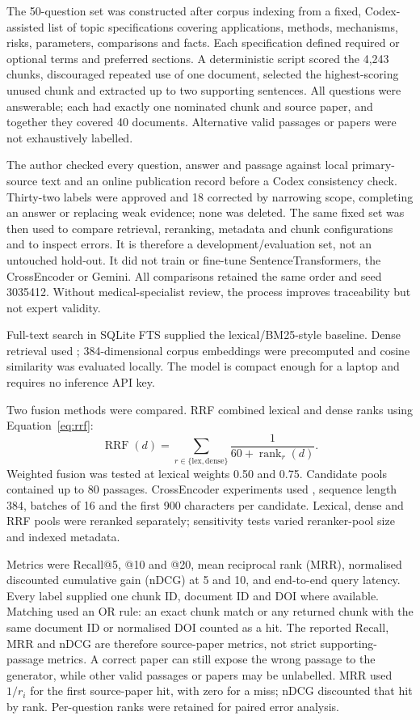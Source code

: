 \documentclass[11pt,a4paper]{article}
\begin{document}
The 50-question set was constructed after corpus indexing from a fixed, Codex-assisted list of topic specifications covering applications, methods, mechanisms, risks, parameters, comparisons and facts. Each specification defined required or optional terms and preferred sections. A deterministic script scored the 4,243 chunks, discouraged repeated use of one document, selected the highest-scoring unused chunk and extracted up to two supporting sentences. All questions were answerable; each had exactly one nominated chunk and source paper, and together they covered 40 documents. Alternative valid passages or papers were not exhaustively labelled.

The author checked every question, answer and passage against local primary-source text and an online publication record before a Codex consistency check. Thirty-two labels were approved and 18 corrected by narrowing scope, completing an answer or replacing weak evidence; none was deleted. The same fixed set was then used to compare retrieval, reranking, metadata and chunk configurations and to inspect errors. It is therefore a development/evaluation set, not an untouched hold-out. It did not train or fine-tune SentenceTransformers, the CrossEncoder or Gemini. All comparisons retained the same order and seed 3035412. Without medical-specialist review, the process improves traceability but not expert validity.

Full-text search in SQLite FTS supplied the lexical/BM25-style baseline. Dense retrieval used ; 384-dimensional corpus embeddings were precomputed and cosine similarity was evaluated locally. The model is compact enough for a laptop and requires no inference API key.

Two fusion methods were compared. RRF combined lexical and dense ranks using Equation~\eqref{eq:rrf}:
\begin{equation}
\label{eq:rrf}
\operatorname{RRF}(d)=\sum_{r\in\{\mathrm{lex},\mathrm{dense}\}}
\frac{1}{60+\operatorname{rank}_{r}(d)} .
\end{equation}
Weighted fusion was tested at lexical weights 0.50 and 0.75. Candidate pools contained up to 80 passages. CrossEncoder experiments used , sequence length 384, batches of 16 and the first 900 characters per candidate. Lexical, dense and RRF pools were reranked separately; sensitivity tests varied reranker-pool size and indexed metadata.

Metrics were Recall@5, @10 and @20, mean reciprocal rank (MRR), normalised discounted cumulative gain (nDCG) at 5 and 10, and end-to-end query latency. Every label supplied one chunk ID, document ID and DOI where available. Matching used an OR rule: an exact chunk match or any returned chunk with the same document ID or normalised DOI counted as a hit. The reported Recall, MRR and nDCG are therefore source-paper metrics, not strict supporting-passage metrics. A correct paper can still expose the wrong passage to the generator, while other valid passages or papers may be unlabelled. MRR used \(1/r_i\) for the first source-paper hit, with zero for a miss; nDCG discounted that hit by rank. Per-question ranks were retained for paired error analysis.
\end{document}
